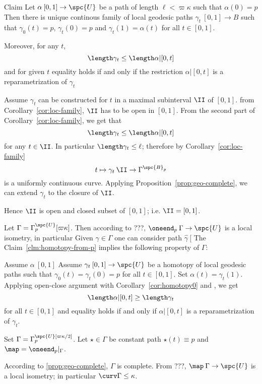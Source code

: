 \begin{clm}{Claim}\label{clm:homotopy-from-p}
Let  $\alpha\:[0,1]\to \spc{U}$ be a path of length $\ell<\varpi\kappa$
such that $\alpha(0)=p$
Then there is unique continous family of local geodesic paths $\gamma_t\:[0,1]\to B$
such that $\gamma_0(t)=p$, $\gamma_t(0)=p$ and $\gamma_t(1)=\alpha(t)$ for all $t\in[0,1]$.

Moreover, for any $t$,
$$\length\gamma_t\le\length\alpha|[0,t]$$
and for given $t$ equality holds if and only if the restriction $\alpha|[0,t]$ is a reparametrization of $\gamma_t$
\end{clm}

Assume $\gamma_t$ can be constructed for $t$ in a maximal subinterval $\II$ of $[0,1]$.
from Corollary~\ref{cor:loc-family}, $\II$ has to be open in $[0,1]$.
From the second part of Corollary~\ref{cor:loc-family},
we get that
$$\length\gamma_t\le\length\alpha|[0,t]$$
for any $t\in\II$.
In particular $\length\gamma_t\le\ell$;
therefore by Corollary~\ref{cor:loc-family}
$$t\mapsto\gamma_t\:\II\to\Gamma^{\spc{B}_p}$$ 
is a uniformly continuous curve.
Applying  Proposition~\ref{prop:geo-complete}, we can extend $\gamma_t$ to the closure of $\II$.

Hence $\II$ is open and closed subset of $[0,1]$;
i.e. $\II=[0,1]$.
\qeds

Let $\Gamma=\Gamma^\spc{U}_p[\varpi\kappa]$.
Then according to ???, $\oneend_p\:\Gamma\to\spc{U}$ is a local isometry, in particular 
Given $\gamma\in\Gamma$ one can consider path $\hat\gamma\:[$
The Claim~\ref{clm:homotopy-from-p} implies the following property of $\Gamma$:




Assume $\alpha\:[0,1]$
Assume $\gamma_t\:[0,1]\to\spc{U}$ be a homotopy of local geodesic paths
such that $\gamma_0(t)=\gamma_t(0)=p$ for all $t\in[0,1]$.
Set $\alpha(t)=\gamma_t(1)$.
Applying open-close argument with Corollary~\ref{cor:homotopy0} and , we get
$$\length\alpha|[0,t]\ge\length\gamma_t$$
for all $t\in [0,1]$ 
and equality holds if and only if $\alpha|[0,t]$ is a reparametrization of $\gamma_t$.





Set $\Gamma=\Gamma_{p}^\spc{U}[\varpi\kappa/2]$.
Let $\star\in\Gamma$ be constant path $\star(t)\equiv p$
and $\map=\oneend_p|_\Gamma$.

According to \ref{prop:geo-complete}, $\Gamma$ is complete.
From ???,  $\map\:\Gamma\to \spc{U}$ is a local isometry;
in particular $\curv\Gamma\le\kappa$.



